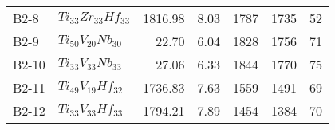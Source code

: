 \begin{tabular}{llrrrrr}
         B2-8 &                                $Ti_{33}Zr_{33}Hf_{33}$ &              1816.98 &                           8.03 &                              1787 &                             1735 &                                        52 \\
         B2-9 &                                 $Ti_{50}V_{20}Nb_{30}$ &                22.70 &                           6.04 &                              1828 &                             1756 &                                        71 \\
        B2-10 &                                 $Ti_{33}V_{33}Nb_{33}$ &                27.06 &                           6.33 &                              1844 &                             1770 &                                        75 \\
        B2-11 &                                 $Ti_{49}V_{19}Hf_{32}$ &              1736.83 &                           7.63 &                              1559 &                             1491 &                                        69 \\
        B2-12 &                                 $Ti_{33}V_{33}Hf_{33}$ &              1794.21 &                           7.89 &                              1454 &                             1384 &                                        70 \\
\bottomrule
\end{tabular}
